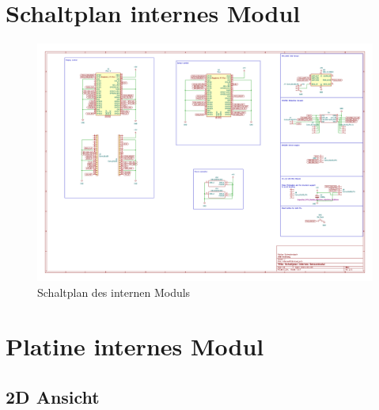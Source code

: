 \documentclass[a4paper,11pt]{article}
\begin{document}
\newpage
\section{Schaltplan internes Modul}

\begin{figure}[H]
  \centering
  \includegraphics[scale=0.7, page=1, angle=90]{../pcbs/InternalPCB/InternalPCB.pdf}
  \caption{Schaltplan des internen Moduls}
  \label{pdf:schaltplanIntern}
\end{figure}

\newpage
\section{Platine internes Modul}

\subsection{2D Ansicht}
\end{document}
